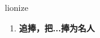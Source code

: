 
\begin{frame}
{\huge lionize}
\begin{center}
\begin{enumerate}\Large
  \item \textbf{追捧，把...捧为名人}
\end{enumerate}
\end{center}
\end{frame}
